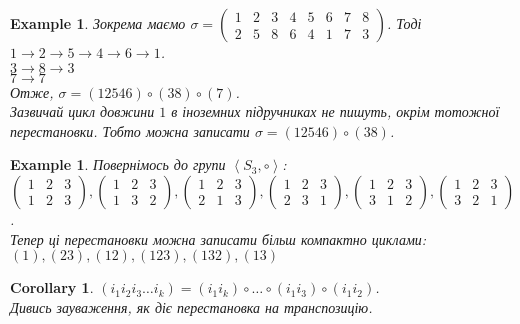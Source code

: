 \documentclass[a4paper, 10pt]{article}
\theoremstyle{theoremdd}
\theoremstyle{theoremdd}
\theoremstyle{theoremdd}
\theoremstyle{theoremdd}
\theoremstyle{theoremdd}
\newtheorem{example}[theorem]{Example}
\theoremstyle{theoremdd}
\theoremstyle{theoremdd}
\theoremstyle{theoremdd}
\theoremstyle{theoremdd}
\theoremstyle{theoremdd}
\theoremstyle{theoremdd}
\theoremstyle{theoremdd}
\theoremstyle{theoremdd}
\theoremstyle{theoremdd}
\newtheorem{corollary}[theorem]{Corollary}
\theoremstyle{theoremdd}
\begin{document}
\begin{example}
Зокрема маємо $\sigma = \begin{pmatrix}
1 & 2 & 3 & 4 & 5 & 6 & 7 & 8 \\
2 & 5 & 8 & 6 & 4 & 1 & 7 & 3
\end{pmatrix}$. Тоді\\
$1 \to 2 \to 5 \to 4 \to 6 \to 1$.\\
$3 \to 8 \to 3$\\
$7 \to 7$\\
Отже, $\sigma = (12546) \circ (38) \circ (7)$.\\
\textit{Зазвичай цикл довжини $1$ в іноземних підручниках не пишуть, окрім тотожної перестановки. Тобто можна записати $\sigma = (12546) \circ (38)$.}
\end{example}

\begin{example}
Повернімось до групи $\left< S_3, \circ \right>$:\\
$\begin{pmatrix}
1 & 2 & 3 \\
1 & 2 & 3
\end{pmatrix}, \begin{pmatrix}
1 & 2 & 3 \\
1 & 3 & 2
\end{pmatrix}, \begin{pmatrix}
1 & 2 & 3 \\
2 & 1 & 3
\end{pmatrix}, \begin{pmatrix}
1 & 2 & 3 \\
2 & 3 & 1
\end{pmatrix}, \begin{pmatrix}
1 & 2 & 3 \\
3 & 1 & 2
\end{pmatrix}, \begin{pmatrix}
1 & 2 & 3 \\
3 & 2 & 1
\end{pmatrix}$.\\
Тепер ці перестановки можна записати більш компактно циклами:\\
$(1), (23), (12), (123), (132), (13)$
\end{example}

\begin{corollary}
$(i_1 i_2 i_3\dots i_k) = (i_1 i_k) \circ \dots \circ (i_1 i_3) \circ (i_1 i_2)$.\\
\textit{Дивись зауваження, як діє перестановка на транспозицію.}
\end{corollary}
\end{document}
